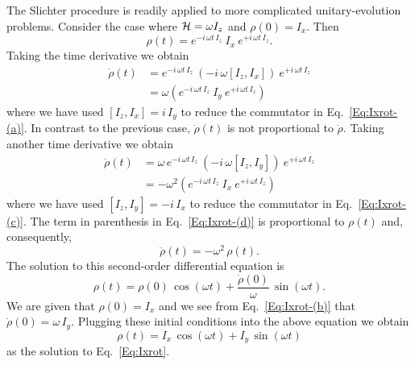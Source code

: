  The Slichter procedure is readily applied to more complicated unitary-evolution problems.  Consider the case where ${\cal H} = \omega I_z$ and $\rho(0) = I_x$.  Then
\begin{equation}
\rho(t) 
	= e^{-i \, \omega t \, I_z} \: I_x \: e^{+i \, \omega t \, I_z}.
	\label{Eq:Ixrot}
\end{equation}
Taking the time derivative we obtain
\begin{subequations}  
\begin{align}
\dot{\rho}(t)
	& = e^{-i \, \omega t \, I_z} \: 
		(-i \, \omega [I_z,I_x] ) 
		\: e^{+i \, \omega t \, I_z} 
		\label{Eq:Ixrot-(a)} \\
	& = \omega \left( 
			e^{-i \, \omega t \, I_z} \: I_y \: e^{+i \, \omega t \, I_z} 
		\right)
		\label{Eq:Ixrot-(b)}
\end{align}
\end{subequations} 
where we have used $[I_z,I_x] = i \, I_y$ to reduce the commutator in Eq.~\ref{Eq:Ixrot-(a)}.  In contrast to the previous case, $\dot{\rho}(t)$ is not proportional to $\dot{\rho}$.  Taking another time derivative we obtain
\begin{subequations}  
\begin{align}
\ddot{\rho}(t)
	& = \omega \, e^{-i \, \omega t \, I_z} \: 
		(-i \, \omega [I_z,I_y] ) 
		\: e^{+i \, \omega t \, I_z} 
		\label{Eq:Ixrot-(c)} \\
	& = - \omega^2 \left( 
			e^{-i \, \omega t \, I_z} \: I_x \: e^{+i \, \omega t \, I_z} 
		\right)
		\label{Eq:Ixrot-(d)}
\end{align}
\end{subequations} 
where we have used $[I_z,I_y] = -i \, I_x$ to reduce the commutator in Eq.~\ref{Eq:Ixrot-(c)}. The term in parenthesis in Eq.~\ref{Eq:Ixrot-(d)} is proportional to $\rho(t)$ and, consequently,
\begin{equation}
\ddot{\rho}(t) = - \omega^2 \, \rho(t). \label{Eq:Ixrot-ODE}
\end{equation}
The solution to this second-order differential equation is
\begin{equation}
\rho(t) = \rho(0) \, \cos{(\omega t)} + \frac{\dot{\rho}(0)}{\omega} \, \sin{(\omega t)}.
\end{equation}
We are given that $\rho(0) = I_x$ and we see from Eq.~\ref{Eq:Ixrot-(b)} that $\dot{\rho}(0) = \omega \, I_y$.  Plugging these initial conditions into the above equation we obtain
\begin{equation}
\rho(t) 
	= I_x \, \cos{(\omega t)} + I_y \, \sin{(\omega t)}
	\label{Eq:Ixrot-soln}
\end{equation}
as the solution to Eq.~\ref{Eq:Ixrot}.

